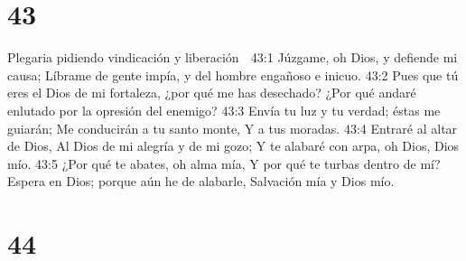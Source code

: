 \chapter{43}

Plegaria pidiendo vindicación y liberación 

43:1 Júzgame, oh Dios, y defiende mi causa; 
Líbrame de gente impía, y del hombre engañoso e inicuo. 
43:2 Pues que tú eres el Dios de mi fortaleza, ¿por qué me has desechado? 
¿Por qué andaré enlutado por la opresión del enemigo? 
43:3 Envía tu luz y tu verdad; éstas me guiarán; 
Me conducirán a tu santo monte, 
Y a tus moradas. 
43:4 Entraré al altar de Dios, 
Al Dios de mi alegría y de mi gozo; 
Y te alabaré con arpa, oh Dios, Dios mío. 
43:5 ¿Por qué te abates, oh alma mía, 
Y por qué te turbas dentro de mí? 
Espera en Dios; porque aún he de alabarle, 
Salvación mía y Dios mío. 

\chapter{44}

